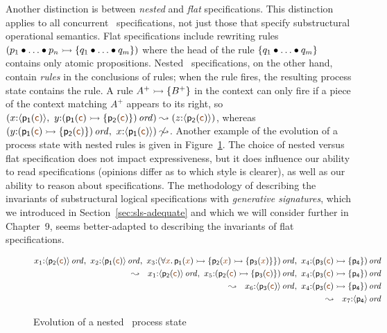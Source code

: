 Another
distinction is between  {\it nested} and {\it flat}
specifications. This distinction applies to all concurrent
\sls~specifications, not just those that specify substructural
operational semantics. Flat
specifications include rewriting rules $\left( p_1 \mathbin{\bullet} \ldots \mathbin{\bullet}
  p_n \rightarrowtail \{ q_1 \mathbin{\bullet} \ldots \mathbin{\bullet} q_m \} \right)$ where the head
of the rule $\{ q_1 \mathbin{\bullet} \ldots \mathbin{\bullet} q_m \}$ contains only atomic
propositions. Nested \sls~specifications, on the other hand,
contain {\it rules} in the conclusions of rules; when the rule fires,
the resulting process state contains the rule. 
A rule $A^+ \rightarrowtail \{ B^+ \}$ in the context can only fire if a piece 
of the context
matching $A^+$ appears to its right, so  $\left(x{:}\susp{\sf p_1(\lf{c})}, ~
y{:}\istrue{\left( {\sf p_1(\lf{c})} \lefti \{ {\sf p_2(\lf{c})} \} \right)}\right)
\leadsto \left(z{:}\susp{\sf p_2(\lf{c})}\right)$, whereas 
$\left(y{:}\istrue{\left( {\sf p_1(\lf{c})} \lefti \{ {\sf p_2(\lf{c})} \} \right)},~
x{:}\susp{\sf p_1(\lf{c})}\right)
\not \leadsto$. Another example of the evolution of a 
process state with nested rules is given 
in Figure~\ref{fig:ho-evo-ex}.
%
The choice of nested versus flat specification does not impact
expressiveness, but it does influence our ability to read
specifications (opinions differ as to which style is clearer), as well
as our ability to reason about specifications. The methodology of
describing the invariants of substructural logical specifications with
{\it generative signatures}, which we introduced in
Section~\ref{sec:sls-adequate} and which we will consider further in
Chapter~9, seems better-adapted to describing the invariants of flat
specifications.

\begin{figure}[t]
{\small \begin{align*}
x_1{:}\istrue{\susp{{\sf p_2}(\lf{\sf c})}}, ~
x_2{:}\istrue{\susp{{\sf p_1}(\lf{\sf c})}}, ~
x_3{:}\istrue{(\forall \lf{x}.\,{\sf p_1}(\lf{x}) 
                \lefti \{ {\sf p_2}(\lf{x}) \lefti \{ {\sf p_3}(\lf{x}) \} \})}, ~
x_4{:}\istrue{({\sf p_3}(\lf{\sf c}) \lefti \{ {\sf p_4} \})} & \\
\leadsto ~~ 
x_1{:}\istrue{\susp{{\sf p_2}(\lf{\sf c})}}, ~
x_5{:}\istrue{({\sf p_2}(\lf{\sf c}) \lefti \{ {\sf p_3}(\lf{\sf c}) \})}, ~
x_4{:}\istrue{({\sf p_3}(\lf{\sf c}) \lefti \{ {\sf p_4} \})} & \\
\leadsto ~~ 
x_6{:}\istrue{\susp{{\sf p_3}(\lf{\sf c})}}, ~
x_4{:}\istrue{({\sf p_3}(\lf{\sf c}) \lefti \{ {\sf p_4} \})} & \\
\leadsto ~~ 
x_7{:}\istrue{\susp{{\sf p_4}}} & 
\end{align*}}\vspace{-18pt}
\caption{Evolution of a nested \sls~process state}
\label{fig:ho-evo-ex}
\end{figure}

